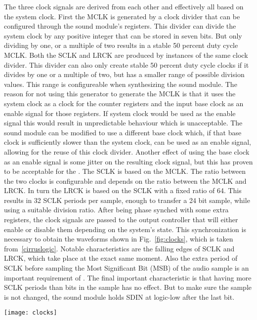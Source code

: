 The three clock signals are derived from each other and effectively all based on the system clock. First the MCLK is generated by a clock divider that can be configured through the sound module's registers. This divider can divide the system clock by any positive integer that can be stored in seven bits. But only dividing by one, or a multiple of two results in a stable 50 percent duty cycle MCLK. Both the SCLK and LRCK are produced by instances of the same clock divider. This divider can also only create stable 50 percent duty cycle clocks if it divides by one or a multiple of two, but has a smaller range of possible division values. This range is configureable when synthesizing the sound module. The reason for not using this generator to generate the MCLK is that it uses the system clock as a clock for the counter registers and the input base clock as an enable signal for those registers. If system clock would be used as the enable signal this would result in unpredictable behaviour which is unacceptable. The sound module can be modified to use a different base clock which, if that base clock is sufficiently slower than the system clock, can be used as an enable signal, allowing for the reuse of this clock divider. Another effect of using the base clock as an enable signal is some jitter on the resulting clock signal, but this has proven to be acceptable for the \cs. The SCLK is based on the MCLK. The ratio between the two clocks is configurable and depends on the ratio between the MCLK and LRCK. In turn the LRCK is based on the SCLK with a fixed ratio of 64. This results in 32 SCLK periods per sample, enough to transfer a 24 bit sample, while using a suitable division ratio. After being phase synched with some extra registers, the clock signals are passed to the output controller that will either enable or disable them depending on the system's state. This synchronization is necessary to obtain the waveforms shown in Fig.~\ref{fig:clocks}, which is taken from~\ref{cirruslogic}. Notable characteristics are the falling edges of SCLK and LRCK, which take place at the exact same moment. Also the extra period of SCLK before sampling the Most Significant Bit (MSB) of the audio sample is an important requirement of \cs. The final important characteristic is that having more SCLK periods than bits in the sample has no effect. But to make sure the sample is not changed, the sound module holds SDIN at logic-low after the last bit.
\begin{figure*}[t]
 \texttt{[image: clocks]}
 \caption{A representation of the LRCK, SCLK and SDIN signals. It shows the required phase synchronization the signals and sampling moments of SDIN.}
 \label{fig:clocks}
\end{figure*}

